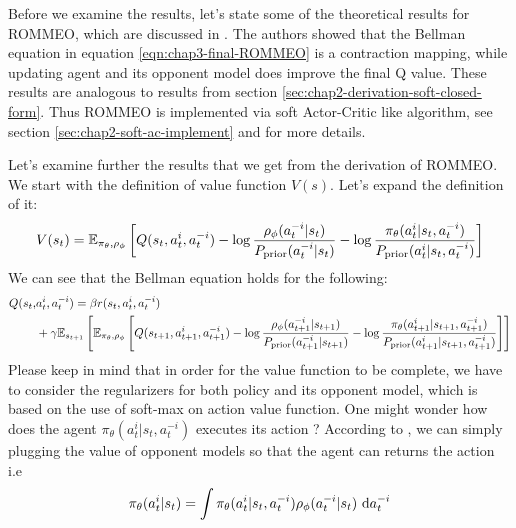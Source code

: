 \label{sec:chap3-ROMMEO-interpretation}
Before we examine the results, let's state some of the theoretical results for ROMMEO, which are discussed in \cite{tian2019regularized}. The authors showed that the Bellman equation in equation \ref{eqn:chap3-final-ROMMEO} is a contraction mapping, while updating agent and its opponent model does improve the final Q value. These results are analogous to results from section \ref{sec:chap2-derivation-soft-closed-form}. Thus ROMMEO is implemented via soft Actor-Critic like algorithm, see section \ref{sec:chap2-soft-ac-implement} and \cite{tian2019regularized} for more details. 

Let's examine further the results that we get from the derivation of ROMMEO. We start with the definition of value function $V(s)$. Let's expand the definition of it:
\begin{equation}
    V(s_{t}) =\mathbb{E}_{\pi_\theta, \rho_\phi}\left[ Q(s_t, a^i_t, a^{-i}_t) - \log\frac{\rho_\phi(a^{-i}_t | s_t)}{P_{\text{prior}}(a^{-i}_t | s_t)} - \log\frac{\pi_{\theta}(a^i_t | s_t, a^{-i}_t) }{P_{\text{prior}}(a^i_t | s_t, a^{-i}_t)} \right]
\end{equation}
We can see that the Bellman equation holds for the following:
\begin{equation}
\begin{aligned}
\label{eqn:chap3-rollout-Q}
    Q(s_{t},& a^i_{t}, a^{-i}_{t}) = \beta r(s_t, a^i_t, a^{-i}_t) \\
    &+ \gamma\mathbb{E}_{s_{t+1}}\left[ \mathbb{E}_{\pi_\theta, \rho_\phi}\left[ Q(s_{t+1}, a^i_{t+1}, a^{-i}_{t+1}) - \log\frac{\rho_\phi(a^{-i}_{t+1} | s_{t+1})}{P_{\text{prior}}(a^{-i}_{t+1} | s_{t+1})} - \log\frac{\pi_{\theta}(a^i_{t+1} | s_{t+1}, a^{-i}_{t+1}) }{P_{\text{prior}}(a^i_{t+1} | s_{t+1}, a^{-i}_{t+1})} \right] \right]
\end{aligned}
\end{equation}
Please keep in mind that in order for the value function to be complete, we have to consider the regularizers for both policy and its opponent model, which is based on the use of soft-max on action value function. One might wonder how does the agent $\pi_\theta(a^i_t | s_t, a^{-i}_t)$ executes its action ? According to \cite{tian2019regularized}, we can simply plugging the value of opponent models so that the agent can returns the action i.e 
\begin{equation}
\label{eqn:chap3-ROMMEO-execute-action}
\pi_\theta(a^i_t |s_t) = \int \pi_\theta(a^i_t | s_t, a^{-i}_t) \rho_\phi(a^{-i}_t | s_t) \ \mathrm{d} a^{-i}_t 
\end{equation}
